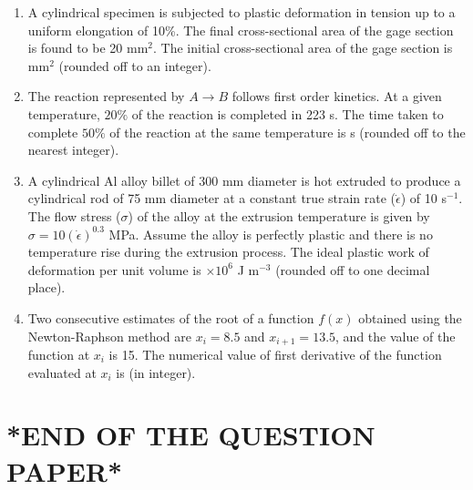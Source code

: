 \documentclass[journal]{IEEEtran}
\theoremstyle{remark}
\begin{document}
\begin{enumerate}[resume]
\item A cylindrical specimen is subjected to plastic deformation in tension up to a uniform elongation of 10\%. The final cross-sectional area of the gage section is found to be 20 mm$^2$. The initial cross-sectional area of the gage section is \underline{\hspace{2cm}} mm$^2$ (rounded off to an integer). \hfill{}

\item The reaction represented by $A \longrightarrow B$ follows first order kinetics. At a given temperature, $20\%$ of the reaction is completed in 223 s. The time taken to complete $50\%$ of the reaction at the same temperature is \underline{\hspace{2cm}} s (rounded off to the nearest integer). \hfill{}

\item A cylindrical Al alloy billet of 300 mm diameter is hot extruded to produce a cylindrical rod of 75 mm diameter at a constant true strain rate ($\dot{\epsilon}$) of 10 s$^{-1}$. The flow stress ($\sigma$) of the alloy at the extrusion temperature is given by $\sigma = 10 (\dot{\epsilon})^{0.3}$ MPa. Assume the alloy is perfectly plastic and there is no temperature rise during the extrusion process. The ideal plastic work of deformation per unit volume is \underline{\hspace{2cm}} $\times 10^6$ J m$^{-3}$ (rounded off to one decimal place). \hfill{}

\item Two consecutive estimates of the root of a function $f(x)$ obtained using the Newton-Raphson method are $x_i = 8.5$ and $x_{i+1} = 13.5$, and the value of the function at $x_i$ is 15. The numerical value of first derivative of the function evaluated at $x_i$ is \underline{\hspace{2cm}} (in integer). \hfill{}

\end{enumerate}

\section*{*END OF THE QUESTION PAPER*}
 
\end{document}
